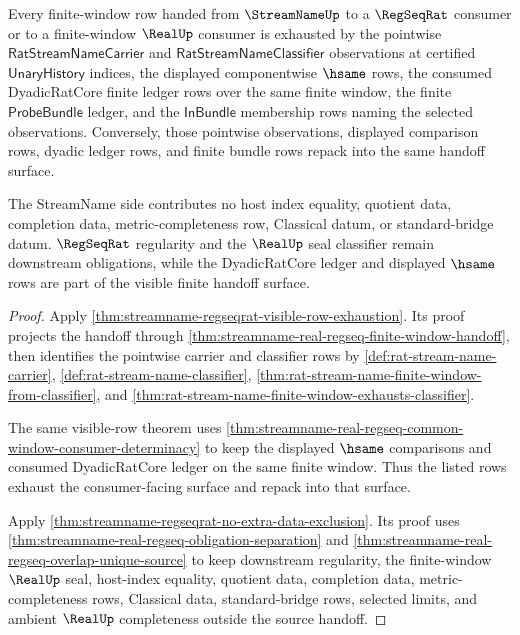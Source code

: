 \begin{theorem}
\label{thm:streamname-regseqrat-pointwise-handoff-exhaustion}
Every finite-window row handed from $\StreamNameUp$ to a $\RegSeqRat$ consumer
or to a finite-window $\RealUp$ consumer is exhausted by the pointwise
$\mathsf{RatStreamNameCarrier}$ and $\mathsf{RatStreamNameClassifier}$
observations at certified $\mathsf{UnaryHistory}$ indices, the displayed
componentwise $\hsame$ rows, the consumed DyadicRatCore finite ledger rows over
the same finite window, the finite $\mathsf{ProbeBundle}$ ledger, and the
$\mathsf{InBundle}$ membership rows naming the selected observations.
Conversely, those pointwise observations, displayed comparison rows, dyadic
ledger rows, and finite bundle rows repack into the same handoff surface.

The StreamName side contributes no host index equality, quotient data,
completion data, metric-completeness row, Classical datum, or standard-bridge
datum. $\RegSeqRat$ regularity and the $\RealUp$ seal classifier remain
downstream obligations, while the DyadicRatCore ledger and displayed $\hsame$
rows are part of the visible finite handoff surface.
\end{theorem}
\begin{proof}
Apply \autoref{thm:streamname-regseqrat-visible-row-exhaustion}. Its proof
projects the handoff through \autoref{thm:streamname-real-regseq-finite-window-handoff},
then identifies the pointwise carrier and classifier rows by
\autoref{def:rat-stream-name-carrier},
\autoref{def:rat-stream-name-classifier},
\autoref{thm:rat-stream-name-finite-window-from-classifier}, and
\autoref{thm:rat-stream-name-finite-window-exhausts-classifier}.

The same visible-row theorem uses
\autoref{thm:streamname-real-regseq-common-window-consumer-determinacy} to keep
the displayed $\hsame$ comparisons and consumed DyadicRatCore ledger on the
same finite window. Thus the listed rows exhaust the consumer-facing surface
and repack into that surface.

Apply \autoref{thm:streamname-regseqrat-no-extra-data-exclusion}. Its proof
uses \autoref{thm:streamname-real-regseq-obligation-separation} and
\autoref{thm:streamname-real-regseq-overlap-unique-source} to keep downstream
regularity, the finite-window $\RealUp$ seal, host-index equality, quotient
data, completion data, metric-completeness rows, Classical data, standard-bridge
rows, selected limits, and ambient $\RealUp$ completeness outside the source
handoff.
\end{proof}

